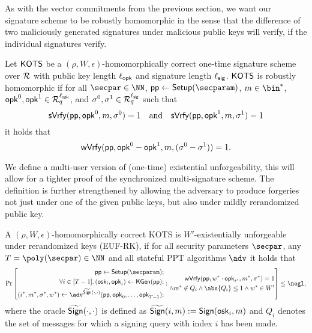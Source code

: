 As with the vector commitments from the previous section, we want our signature scheme to be robustly homomorphic in the sense that the difference of two maliciously generated signatures under malicious public keys will verify, if the individual signatures verify.

\begin{definition}
  \label{def:malhomhots}
  Let $\mathsf{KOTS}$ be a $(\rho,W,\epsilon)$-homomorphically correct one-time signature scheme over $\mathcal{R}$ with public key length ${\ell_{\mathsf{opk}}}$ and signature length ${\ell_{\mathsf{sig}}}$.
  $\mathsf{KOTS}$ is robustly homomorphic if for all $\secpar\in\NN$, $\params\gets\setup(\secparam)$, $m\in\bin^*$, $\mathsf{opk}^0,\mathsf{opk}^1 \in \mathcal{R}_q^{\ell_{\mathsf{opk}}}$, and $\sigma^0,\sigma^1\in\mathcal{R}_q^{\ell_{\mathsf{sig}}}$ such that
  \[
    \mathsf{sVrfy}(\mathsf{pp},\mathsf{opk}^0, m,\sigma^0)=1 \quad \text{and} \quad \mathsf{sVrfy}(\mathsf{pp},\mathsf{opk}^1, m,\sigma^1)=1
  \]
  it holds that
  \[
    \mathsf{wVrfy}(\mathsf{pp},\mathsf{opk}^0-\mathsf{opk}^1, m,(\sigma^0-\sigma^1))=1.
  \]
\end{definition}

We define a multi-user version of (one-time) existential unforgeability, this will allow for a tighter proof of the synchronized multi-signature scheme.
The definition is further strengthened by allowing the adversary to produce forgeries not just under one of the given public keys, but also under mildly rerandomized public key.

\begin{definition}
  A $(\rho,W,\epsilon)$-homomorphically correct KOTS is $W'$-existentially unforgeable under rerandomized keys (EUF-RK), if for all security parameters $\secpar$, any $T=\poly(\secpar)\in\NN$ and all stateful PPT algorithms $\adv$ it holds that
  \[
    \Pr\left[
      \begin{aligned}
      \params \gets \setup(\secparam);\\
      \forall i \in [T-1]\ldotp (\osk_i,\opk_i) \gets \kgen(\params);\\
      (i^*,m^*,\sigma^*,w^*) \gets \adv^{\widetilde\sign(\cdot,\cdot)}(\params,\opk_0,\dots,\opk_{T-1});\\
      \end{aligned}:
      \begin{aligned}
      \wverify(\params,w^*\cdot\opk_{i^*},m^*,\sigma^*) = 1\\
      \land m^*\not\in Q_i \land \abs{Q_i}\leq 1 \land w^* \in W'
      \end{aligned}
    \right]\leq \negl,
  \]
  where the oracle $\widetilde{\mathsf{Sign}}(\cdot,\cdot)$ is defined as $\widetilde{\mathsf{Sign}}(i,m) := \mathsf{Sign}(\mathsf{osk}_i,m)$ and $Q_i$ denotes the set of messages for which a signing query with index $i$ has been made.
\end{definition}

